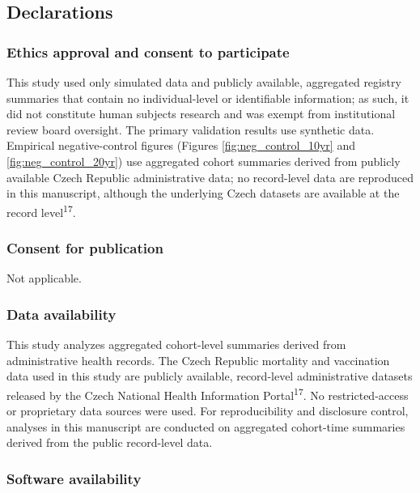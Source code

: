 \documentclass[
]{article}
\begin{document}
\subsection{Declarations}\label{declarations}

\subsubsection{Ethics approval and consent to
participate}\label{ethics-approval-and-consent-to-participate}

This study used only simulated data and publicly available, aggregated
registry summaries that contain no individual-level or identifiable
information; as such, it did not constitute human subjects research and
was exempt from institutional review board oversight. The primary
validation results use synthetic data. Empirical negative-control
figures (Figures \ref{fig:neg_control_10yr} and
\ref{fig:neg_control_20yr}) use aggregated cohort summaries derived from
publicly available Czech Republic administrative data; no record-level
data are reproduced in this manuscript, although the underlying Czech
datasets are available at the record level\textsuperscript{17}.

\subsubsection{Consent for publication}\label{consent-for-publication}

Not applicable.

\subsubsection{Data availability}\label{data-availability}

This study analyzes aggregated cohort-level summaries derived from
administrative health records. The Czech Republic mortality and
vaccination data used in this study are publicly available, record-level
administrative datasets released by the Czech National Health
Information Portal\textsuperscript{17}. No restricted-access or
proprietary data sources were used. For reproducibility and disclosure
control, analyses in this manuscript are conducted on aggregated
cohort-time summaries derived from the public record-level data.

\subsubsection{Software availability}\label{software-availability}
\end{document}
